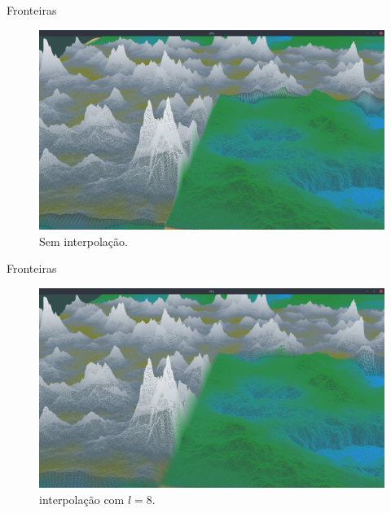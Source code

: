 \begin{frame}{Fronteiras}
    \begin{figure}[H]
        \centering
        \includegraphics[width=.9\textwidth]{img/borders/0lm.png}
        \caption{Sem interpolação.}
        \label{fig:img_borders_0lm}
    \end{figure}
    
\end{frame}

\begin{frame}{Fronteiras}
    \begin{figure}[H]
        \centering
        \includegraphics[width=.9\textwidth]{img/borders/8lm.png}
        \caption{interpolação com $l = 8$.}
        \label{fig:img_borders_8lm}
    \end{figure}
    
\end{frame}


